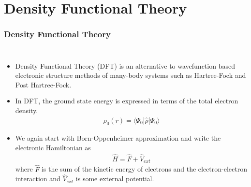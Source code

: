 \documentclass[slidestop,mathserif,compress,xcolor=svgnames]{beamer}
\begin{document}
\section{Density Functional Theory}
\begin{frame}
\frametitle{\small Density Functional Theory}
\footnotesize{
\begin{columns}
\column{12cm}
\begin{itemize}
\item Density Functional Theory (DFT) is an alternative to wavefunction based electronic structure methods of many-body systems such as Hartree-Fock and Post Hartree-Fock.
\item In DFT, the ground state energy is expressed in terms of the total electron density.
\begin{align*}
\rho_0(r) = \langle\Psi_0|\hat{\rho}|\Psi_0\rangle
\end{align*}
\item We again start with Born-Oppenheimer approximation and write the electronic Hamiltonian as
\begin{align*}
\hat{H} = \hat{F} + \hat{V}_{ext}
\end{align*}
where $\hat{F}$ is the sum of the kinetic energy of electrons and the electron-electron interaction and $\hat{V}_{ext}$ is some external potential.
\end{itemize}
\end{columns}
}
\end{frame}
\end{document}
